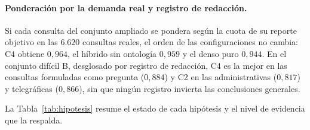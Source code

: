 \documentclass[11pt,letterpaper]{article}
\numberwithin{equation}{section}
\begin{document}
\paragraph{Ponderación por la demanda real y registro de redacción.} Si cada consulta del conjunto ampliado se pondera según la cuota de su reporte objetivo en las $6.620$ consultas reales, el orden de las configuraciones no cambia: C4 obtiene $0{,}964$, el híbrido sin ontología $0{,}959$ y el denso puro $0{,}944$. En el conjunto difícil B, desglosado por registro de redacción, C4 es la mejor en las consultas formuladas como pregunta ($0{,}884$) y C2 en las administrativas ($0{,}817$) y telegráficas ($0{,}866$), sin que ningún registro invierta las conclusiones generales.

La Tabla~\ref{tab:hipotesis} resume el estado de cada hipótesis y el nivel de evidencia que la respalda.
\end{document}
